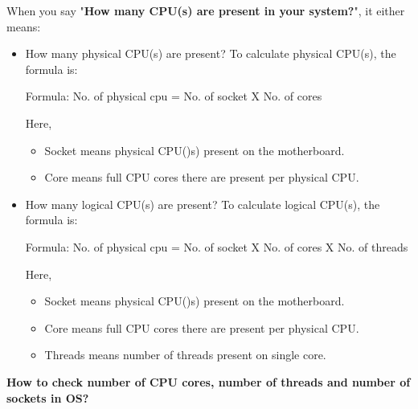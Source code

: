 \setlength{\columnsep}{3pt}
\begin{flushleft}

\bigskip

When you say "\textbf{How many CPU(s) are present in your system?}", it either means:
\begin{itemize}
	\item How many physical CPU(s) are present?
	\newline
	To calculate physical CPU(s), the formula is:
	\begin{tcolorbox}[breakable,notitle,boxrule=-0pt,colback=pink,colframe=pink]
		\color{black}
		
		Formula: No. of physical cpu = No. of socket X No. of cores
		
	\end{tcolorbox}
	Here,
	\begin{itemize}
		\item Socket means physical CPU()s) present on the motherboard.
		\item Core means full CPU cores there are present per physical CPU.
	\end{itemize}
	
	\bigskip
	\bigskip
	\item How many logical CPU(s) are present?
	\newline
	To calculate logical CPU(s), the formula is:
	\begin{tcolorbox}[breakable,notitle,boxrule=-0pt,colback=pink,colframe=pink]
		\color{black}
		
		Formula: No. of physical cpu = No. of socket X No. of cores X No. of threads
		
	\end{tcolorbox}
	Here,
	\begin{itemize}
		\item Socket means physical CPU()s) present on the motherboard.
		\item Core means full CPU cores there are present per physical CPU.
		\item Threads means number of threads present on single core.
	\end{itemize}
\end{itemize}

\newpage

\textbf{How to check number of CPU cores, number of threads and number of sockets in OS?}
\bigskip


\end{flushleft}

